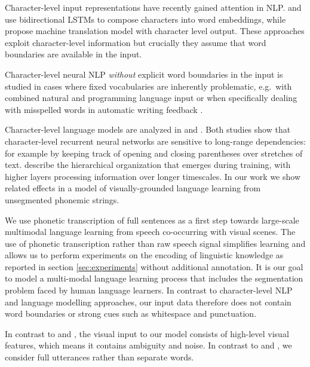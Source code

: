 Character-level input representations have recently gained attention
in NLP.  and
 use bidirectional LSTMs to compose
characters into word embeddings, while
 propose machine translation model with 
character level output. These approaches exploit character-level
information but crucially they assume that word boundaries are available
in the input.

Character-level neural NLP \textit{without} explicit word boundaries in the input is studied in cases where fixed vocabularies are inherently problematic, e.g.\ with combined natural and programming language input \cite{chrupala2013text} or when specifically dealing with misspelled words in automatic writing feedback \cite{xie2016neural}. 

Character-level language models are analyzed in
 and
. Both studies show that
character-level recurrent neural networks are sensitive to
long-range dependencies: for example by keeping track of opening and
closing parentheses over stretches of
text.  describe the hierarchical
organization that emerges during training, with higher layers
processing information over longer timescales. In our work we show
related effects in a model of visually-grounded
language learning from unsegmented phonemic strings.

We use phonetic transcription of full sentences as a first step
towards large-scale multimodal language learning from speech
co-occurring with visual scenes. 
The use of phonetic
transcription rather than raw speech signal simplifies learning
and allows us to perform experiments on the encoding of linguistic
knowledge as reported in section \ref{sec:experiments} without
additional annotation. It is our goal to model a multi-modal language learning process that includes the segmentation problem faced by human language learners. In contrast to character-level NLP and language modelling approaches, our input data therefore does not contain word boundaries or strong cues such as whitespace and punctuation.

In contrast to 
and , the visual input to our model consists
of high-level visual features, which means it contains ambiguity and
noise. In contrast to  and
, we consider full utterances rather than
separate words. 

